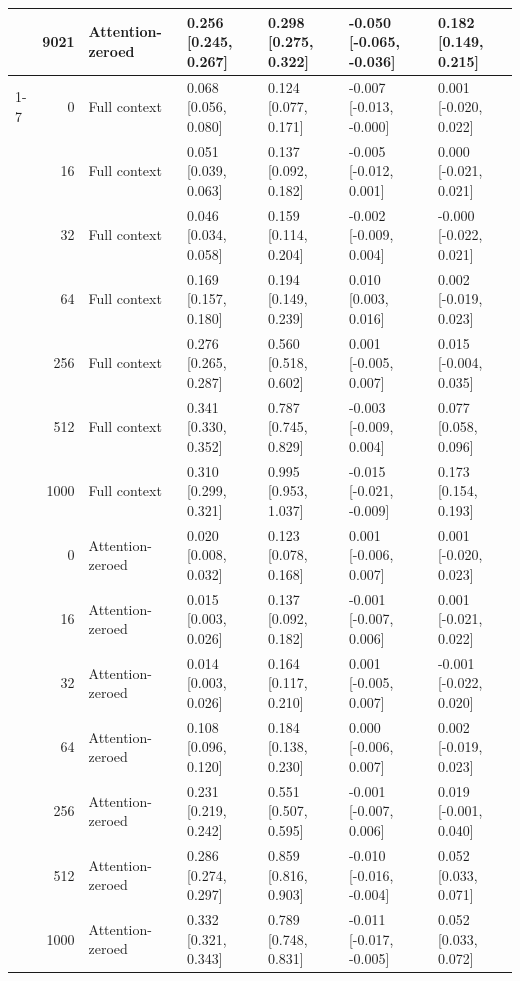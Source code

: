 \documentclass[11pt]{article}
\begin{document}
\begin{longtable}[t]{lrlllll}
\nopagebreak
\multirow{-14}{*}{\raggedright\arraybackslash BabyLM-1.3B} & 9021 & Attention-zeroed & 0.256 [0.245, 0.267] & 0.298 [0.275, 0.322] & -0.050 [-0.065, -0.036] & 0.182 [0.149, 0.215]\\
\cmidrule{1-7}\pagebreak[0]
 & 0 & Full context & 0.068 [0.056, 0.080] & 0.124 [0.077, 0.171] & -0.007 [-0.013, -0.000] & 0.001 [-0.020, 0.022]\\
\nopagebreak
 & 16 & Full context & 0.051 [0.039, 0.063] & 0.137 [0.092, 0.182] & -0.005 [-0.012, 0.001] & 0.000 [-0.021, 0.021]\\
\nopagebreak
 & 32 & Full context & 0.046 [0.034, 0.058] & 0.159 [0.114, 0.204] & -0.002 [-0.009, 0.004] & -0.000 [-0.022, 0.021]\\
\nopagebreak
 & 64 & Full context & 0.169 [0.157, 0.180] & 0.194 [0.149, 0.239] & 0.010 [0.003, 0.016] & 0.002 [-0.019, 0.023]\\
\nopagebreak
 & 256 & Full context & 0.276 [0.265, 0.287] & 0.560 [0.518, 0.602] & 0.001 [-0.005, 0.007] & 0.015 [-0.004, 0.035]\\
\nopagebreak
 & 512 & Full context & 0.341 [0.330, 0.352] & 0.787 [0.745, 0.829] & -0.003 [-0.009, 0.004] & 0.077 [0.058, 0.096]\\
\nopagebreak
 & 1000 & Full context & 0.310 [0.299, 0.321] & 0.995 [0.953, 1.037] & -0.015 [-0.021, -0.009] & 0.173 [0.154, 0.193]\\
\nopagebreak
 & 0 & Attention-zeroed & 0.020 [0.008, 0.032] & 0.123 [0.078, 0.168] & 0.001 [-0.006, 0.007] & 0.001 [-0.020, 0.023]\\
\nopagebreak
 & 16 & Attention-zeroed & 0.015 [0.003, 0.026] & 0.137 [0.092, 0.182] & -0.001 [-0.007, 0.006] & 0.001 [-0.021, 0.022]\\
\nopagebreak
 & 32 & Attention-zeroed & 0.014 [0.003, 0.026] & 0.164 [0.117, 0.210] & 0.001 [-0.005, 0.007] & -0.001 [-0.022, 0.020]\\
\nopagebreak
 & 64 & Attention-zeroed & 0.108 [0.096, 0.120] & 0.184 [0.138, 0.230] & 0.000 [-0.006, 0.007] & 0.002 [-0.019, 0.023]\\
\nopagebreak
 & 256 & Attention-zeroed & 0.231 [0.219, 0.242] & 0.551 [0.507, 0.595] & -0.001 [-0.007, 0.006] & 0.019 [-0.001, 0.040]\\
\nopagebreak
 & 512 & Attention-zeroed & 0.286 [0.274, 0.297] & 0.859 [0.816, 0.903] & -0.010 [-0.016, -0.004] & 0.052 [0.033, 0.071]\\
\nopagebreak
\multirow{-14}{*}{\raggedright\arraybackslash Pythia-160M} & 1000 & Attention-zeroed & 0.332 [0.321, 0.343] & 0.789 [0.748, 0.831] & -0.011 [-0.017, -0.005] & 0.052 [0.033, 0.072]\\

\end{longtable}
\end{document}
